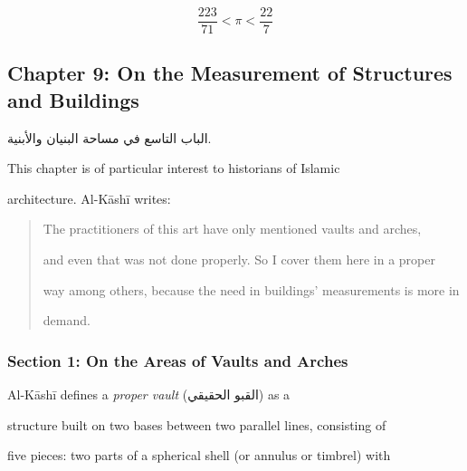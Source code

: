 \documentclass[11pt,a4paper]{article}
\newenvironment{arabicbox}{%

  \begin{framed}

  \begin{minipage}{\linewidth-2\fboxsep-2\fboxrule}

  \setlength{\parindent}{0pt}

  \linespread{1.3}\selectfont

}{%

  \end{minipage}

  \end{framed}

}
\newcommand{\ar}[1]{{\arabicfont\beginR #1\endR}}
\begin{document}
\[

\frac{223}{71} < \pi < \frac{22}{7}

\]



\subsection{Chapter 9: On the Measurement of Structures and Buildings}



\begin{arabicbox}

\begin{Arabic}

الباب التاسع في مساحة البنيان والأبنية.

\end{Arabic}

\end{arabicbox}



\vspace{0.3cm}



This chapter is of particular interest to historians of Islamic

architecture. Al-K\=ash\=i writes:



\begin{quote}

The practitioners of this art have only mentioned vaults and arches,

and even that was not done properly. So I cover them here in a proper

way among others, because the need in buildings' measurements is more in

demand.

\end{quote}



\subsubsection{Section 1: On the Areas of Vaults and Arches}



Al-K\=ash\=i defines a \textit{proper vault} (\ar{القبو الحقيقي}) as a

structure built on two bases between two parallel lines, consisting of

five pieces: two parts of a spherical shell (or annulus or timbrel) with
\end{document}
